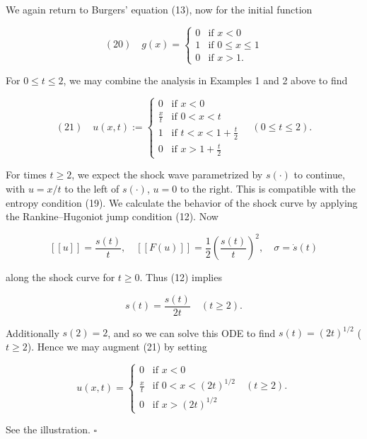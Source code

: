 \begin{example}
\label{ex:burgers-triangular-shock-wave}
We again return to Burgers' equation (13), now for the initial function

$$(20) \quad g(x) = \begin{cases} 0 & \text{if } x < 0 \\ 1 & \text{if } 0 \leq x \leq 1 \\ 0 & \text{if } x > 1. \end{cases}$$

For $0 \leq t \leq 2$, we may combine the analysis in Examples 1 and 2 above to find

$$(21) \quad u(x,t) := \begin{cases} 0 & \text{if } x < 0 \\ \frac{x}{t} & \text{if } 0 < x < t \\ 1 & \text{if } t < x < 1 + \frac{t}{2} \\ 0 & \text{if } x > 1 + \frac{t}{2} \end{cases} \quad (0 \leq t \leq 2).$$

\begin{figure}[h]\centering
\end{figure}

For times $t \geq 2$, we expect the shock wave parametrized by $s(\cdot)$ to continue, with $u = x/t$ to the left of $s(\cdot)$, $u = 0$ to the right. This is compatible with the entropy condition (19). We calculate the behavior of the shock curve by applying the Rankine--Hugoniot jump condition (12). Now

$$[[u]] = \frac{s(t)}{t}, \quad [[F(u)]] = \frac{1}{2}\left(\frac{s(t)}{t}\right)^2, \quad \sigma = \dot{s}(t)$$

along the shock curve for $t \geq 0$. Thus (12) implies

$$s(t) = \frac{s(t)}{2t} \quad (t \geq 2).$$

Additionally $s(2) = 2$, and so we can solve this ODE to find $s(t) = (2t)^{1/2}$ ($t \geq 2$). Hence we may augment (21) by setting

$$u(x,t) = \begin{cases} 0 & \text{if } x < 0 \\ \frac{x}{t} & \text{if } 0 < x < (2t)^{1/2} \quad (t \geq 2). \\ 0 & \text{if } x > (2t)^{1/2} \end{cases}$$

See the illustration. $\square$
\end{example}

